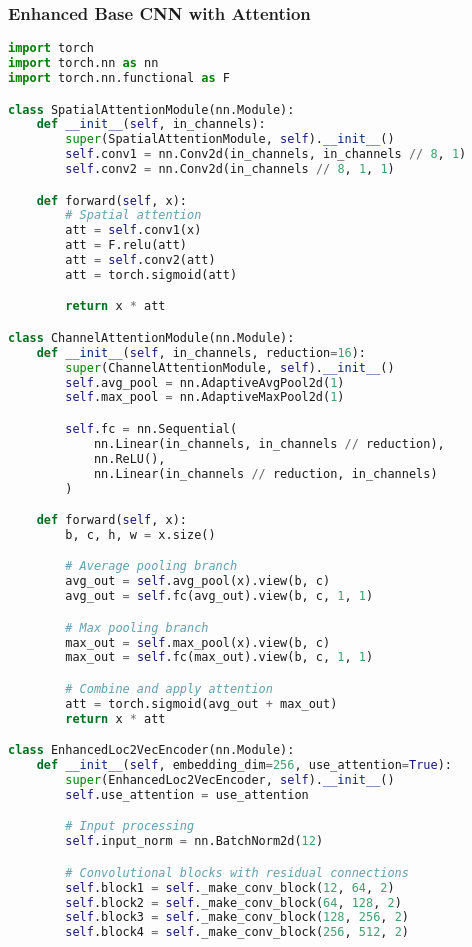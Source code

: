 \subsubsection{Enhanced Base CNN with Attention}

\begin{lstlisting}[language=Python, caption=Enhanced Base CNN Architecture]
import torch
import torch.nn as nn
import torch.nn.functional as F

class SpatialAttentionModule(nn.Module):
    def __init__(self, in_channels):
        super(SpatialAttentionModule, self).__init__()
        self.conv1 = nn.Conv2d(in_channels, in_channels // 8, 1)
        self.conv2 = nn.Conv2d(in_channels // 8, 1, 1)

    def forward(self, x):
        # Spatial attention
        att = self.conv1(x)
        att = F.relu(att)
        att = self.conv2(att)
        att = torch.sigmoid(att)

        return x * att

class ChannelAttentionModule(nn.Module):
    def __init__(self, in_channels, reduction=16):
        super(ChannelAttentionModule, self).__init__()
        self.avg_pool = nn.AdaptiveAvgPool2d(1)
        self.max_pool = nn.AdaptiveMaxPool2d(1)

        self.fc = nn.Sequential(
            nn.Linear(in_channels, in_channels // reduction),
            nn.ReLU(),
            nn.Linear(in_channels // reduction, in_channels)
        )

    def forward(self, x):
        b, c, h, w = x.size()

        # Average pooling branch
        avg_out = self.avg_pool(x).view(b, c)
        avg_out = self.fc(avg_out).view(b, c, 1, 1)

        # Max pooling branch
        max_out = self.max_pool(x).view(b, c)
        max_out = self.fc(max_out).view(b, c, 1, 1)

        # Combine and apply attention
        att = torch.sigmoid(avg_out + max_out)
        return x * att

class EnhancedLoc2VecEncoder(nn.Module):
    def __init__(self, embedding_dim=256, use_attention=True):
        super(EnhancedLoc2VecEncoder, self).__init__()
        self.use_attention = use_attention

        # Input processing
        self.input_norm = nn.BatchNorm2d(12)

        # Convolutional blocks with residual connections
        self.block1 = self._make_conv_block(12, 64, 2)
        self.block2 = self._make_conv_block(64, 128, 2)
        self.block3 = self._make_conv_block(128, 256, 2)
        self.block4 = self._make_conv_block(256, 512, 2)


\end{lstlisting}
